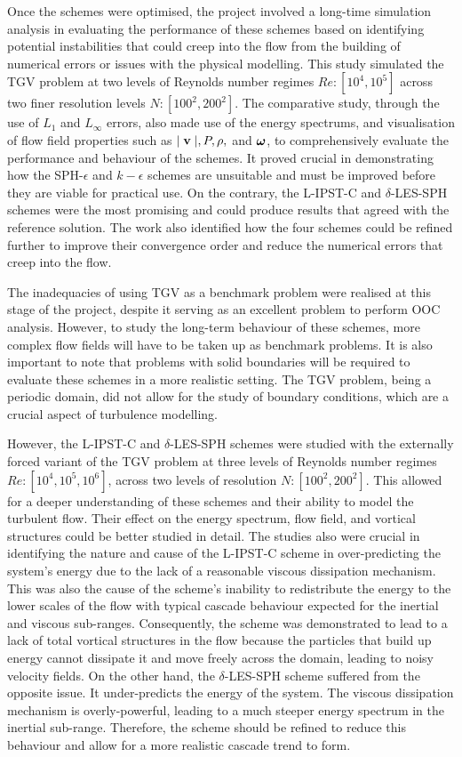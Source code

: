 Once the schemes were optimised, the project involved a long-time simulation analysis in evaluating the performance of these schemes based on identifying potential instabilities that could creep into the flow from the building of numerical errors or issues with the physical modelling. This study simulated the TGV problem at two levels of Reynolds number regimes $Re: [10^4, 10^5]$ across two finer resolution levels $N: [100^2, 200^2]$.
The comparative study, through the use of $L_1$ and $L_{\infty}$ errors, also made use of the energy spectrums, and visualisation of flow field properties such as $\mid \mathbf{v} \mid, P, \rho,$ and  $\mathbf{\bm{\omega}}$, to comprehensively evaluate the performance and behaviour of the schemes.
It proved crucial in demonstrating how the SPH-$\epsilon$ and $k-\epsilon$ schemes are unsuitable and must be improved before they are viable for practical use. 
On the contrary, the L-IPST-C and $\delta$-LES-SPH schemes were the most promising and could produce results that agreed with the reference solution.
The work also identified how the four schemes could be refined further to improve their convergence order and reduce the numerical errors that creep into the flow.

The inadequacies of using TGV as a benchmark problem were realised at this stage of the project, despite it serving as an excellent problem to perform OOC analysis. However,  to study the long-term behaviour of these schemes, more complex flow fields will have to be taken up as benchmark problems. It is also important to note that problems with solid boundaries will be required to evaluate these schemes in a more realistic setting. The TGV problem, being a periodic domain, did not allow for the study of boundary conditions, which are a crucial aspect of turbulence modelling.

However, the L-IPST-C and $\delta$-LES-SPH schemes were studied with the externally forced variant of the TGV problem at three levels of Reynolds number regimes $Re: [10^4, 10^5, 10^6]$, across two levels of resolution $N: [100^2, 200^2]$.
This allowed for a deeper understanding of these schemes and their ability to model the turbulent flow. Their effect on the energy spectrum, flow field, and vortical structures could be better studied in detail.
The studies also were crucial in identifying the nature and cause of the L-IPST-C scheme in over-predicting the system's energy due to the lack of a reasonable viscous dissipation mechanism. This was also the cause of the scheme's inability to redistribute the energy to the lower scales of the flow with typical cascade behaviour expected for the inertial and viscous sub-ranges. Consequently, the scheme was demonstrated to lead to a lack of total vortical structures in the flow because the particles that build up energy cannot dissipate it and move freely across the domain, leading to noisy velocity fields.
On the other hand, the $\delta$-LES-SPH scheme suffered from the opposite issue. It under-predicts the energy of the system. The viscous dissipation mechanism is overly-powerful, leading to a much steeper energy spectrum in the inertial sub-range. Therefore, the scheme should be refined to reduce this behaviour and allow for a more realistic cascade trend to form.

